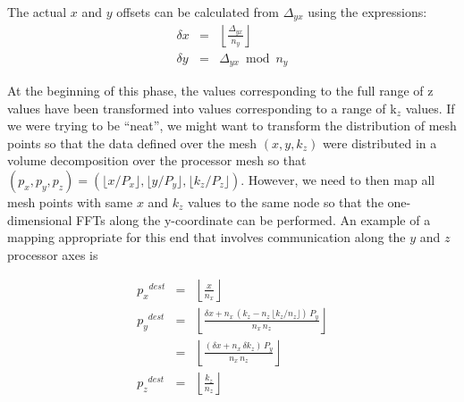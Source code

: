 \documentclass[pdftex,finalversion,simpleeqnnos,titlepage,12pt]{article}
\newcommand{\nodecount}{\ensuremath{P}}
\newcommand{\nodemeshsize}[1]{\ensuremath{\nodecount_{#1}}}
\newcommand{\nodecoord}[1]{\ensuremath{p_{#1}}}
\newcommand{\meshpernode}[1]{\ensuremath{n_{#1}}}
\newcommand{\offset}[2]{\ensuremath{\Delta_{#1#2}}}
\begin{document}
The actual $x$ and $y$ offsets can be calculated from $\offset{y}{x}$
using the expressions:
\begin{eqnarray}
\delta x &=& \left\lfloor \frac{\offset{y}{x}}{\meshpernode{y}}
\right\rfloor \\
\delta y &=& \offset{y}{x} \bmod \meshpernode{y}
\end{eqnarray}


At the beginning of this phase, the values corresponding to the full
range of z values have been transformed into values corresponding to a
range of k$_z$ values. If we were trying to be ``neat'', we might want
to transform the distribution of mesh points so that the data defined
over the mesh $(x, y, k_z)$ were distributed in a volume decomposition
over the processor mesh so that $(\nodecoord{x}, \nodecoord{y},
\nodecoord{z}) = (\lfloor x/\nodemeshsize{x} \rfloor, \lfloor
y/\nodemeshsize{y} \rfloor, \lfloor k_z/\nodemeshsize{z} \rfloor)$.
However, we need to then map all mesh points with same $x$ and $k_z$
values to the same node so that the one-dimensional FFTs along the
y-coordinate can be performed.  An example of a mapping appropriate
for this end that involves communication along the $y$ and $z$
processor axes is

\begin{eqnarray}
\nodecoord{x}^{dest} & = & \left\lfloor \frac{x}{\meshpernode{x}} \right\rfloor \\
\nodecoord{y}^{dest} & = & \left\lfloor\frac{\delta x +
  \meshpernode{x}\,(k_z-\meshpernode{z}\,\lfloor
  k_z/\meshpernode{z}\rfloor)\,\nodemeshsize{y}}{\meshpernode{x}\,\meshpernode{z}} \right\rfloor \\
& = & \left\lfloor\frac{(\delta x + \meshpernode{x}\,\delta
 k_z )\,\nodemeshsize{y}}{\meshpernode{x}\,\meshpernode{z}}
\right\rfloor \nonumber \\ 
\nodecoord{z}^{dest} & = & \left\lfloor\frac{k_z}{\meshpernode{z}}\right\rfloor
\end{eqnarray}
\end{document}
